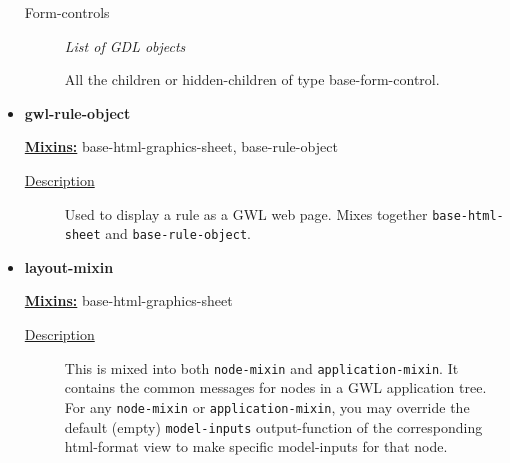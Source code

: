 \documentclass [11pt]{book}
\begin{document}
\begin{itemize}
\begin{description}
\item [Form-controls]
\emph{List of GDL objects}

 All the children or hidden-children
of type base-form-control.




\end{description}







\item {}
\label{prim:gwl-rule-object}
\textbf{gwl-rule-object}


\textbf{
\underline{Mixins:}} base-html-graphics-sheet, base-rule-object





\begin{description}

\item [
\underline{Description}]


Used to display a rule as a GWL web page. 
Mixes together \texttt{base-html-sheet} and \texttt{base-rule-object}.



\end{description}









\item {}
\label{prim:layout-mixin}
\textbf{layout-mixin}


\textbf{
\underline{Mixins:}} base-html-graphics-sheet





\begin{description}

\item [
\underline{Description}]


This is mixed into both \texttt{node-mixin} and \texttt{application-mixin}. It contains the common
messages for nodes in a GWL application tree. For any \texttt{node-mixin} or \texttt{application-mixin}, you may override the default (empty)
\texttt{model-inputs} output-function of the corresponding html-format view to make specific model-inputs for that node.



\end{description}









\end{itemize}
\end{document}
